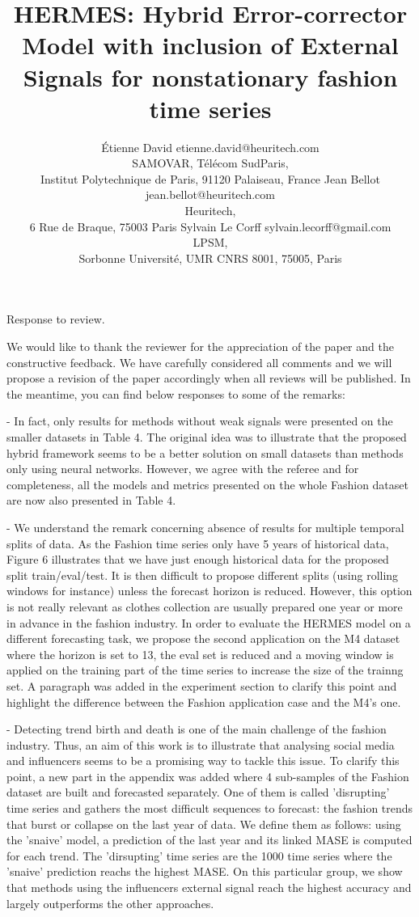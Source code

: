 \documentclass[10pt]{article} %
\title{HERMES: Hybrid Error-corrector Model with inclusion of External Signals for nonstationary fashion time series}
\author{\name \'Etienne David \email etienne.david@heuritech.com \\
      \addr SAMOVAR, Télécom SudParis,\\
      Institut Polytechnique de Paris, 91120 Palaiseau, France
      \AND
      \name Jean Bellot \email jean.bellot@heuritech.com \\
      \addr Heuritech, \\
      6 Rue de Braque, 75003 Paris
      \AND
      \name Sylvain Le Corff \email sylvain.lecorff@gmail.com\\
      \addr LPSM, \\
      Sorbonne Université, UMR CNRS 8001, 75005, Paris
      }
\begin{document}
Response to review.\vspace{0.2cm}

We would like to thank the reviewer for the appreciation of the paper and the constructive feedback. We have carefully considered all comments and we will propose a revision of the paper accordingly when all reviews will be published. In the meantime, you can find below responses to some of the remarks:

- In fact, only results for methods without weak signals were presented on the smaller datasets in Table 4. The original idea was to illustrate that the proposed hybrid framework seems to be a better solution on small datasets than methods only using neural networks. However, we agree with the referee and for completeness, all the models and metrics presented on the whole Fashion dataset are now also presented in Table 4.
	
- We understand the remark concerning absence of results for multiple temporal splits of data. As the Fashion time series only have 5 years of historical data, Figure 6 illustrates that we have just enough historical data for the proposed split train/eval/test. It is then difficult to propose different splits (using rolling windows for instance) unless the forecast horizon is reduced. However, this option is not really relevant as clothes collection are usually prepared one year or more in advance in the fashion industry.  In order to evaluate the HERMES model on a different forecasting task, we propose the second application on the M4 dataset where the horizon is set to 13, the eval set is reduced and a moving window is applied on the training part of the time series to increase the size of the trainng set. A paragraph was added in the experiment section to clarify this point and highlight the difference between the Fashion application case and the M4's one.

- Detecting trend birth and death is one of the main challenge of the fashion industry. Thus, an aim of this work is to illustrate that analysing social media and influencers seems to be a promising way to tackle this issue. To clarify this point, a new part in the appendix was added where 4 sub-samples of the Fashion dataset are built and forecasted separately. One of them is called 'disrupting' time series and gathers the most difficult sequences to forecast: the fashion trends that burst or collapse on the last year of data. We define them as follows: using the 'snaive' model, a prediction of the last year and its linked MASE is computed for each trend. The  'dirsupting' time series are the 1000 time series where the 'snaive' prediction reachs the highest MASE. On this particular group, we show that methods using the influencers external signal reach the highest accuracy and largely outperforms the other approaches.
\end{document}
